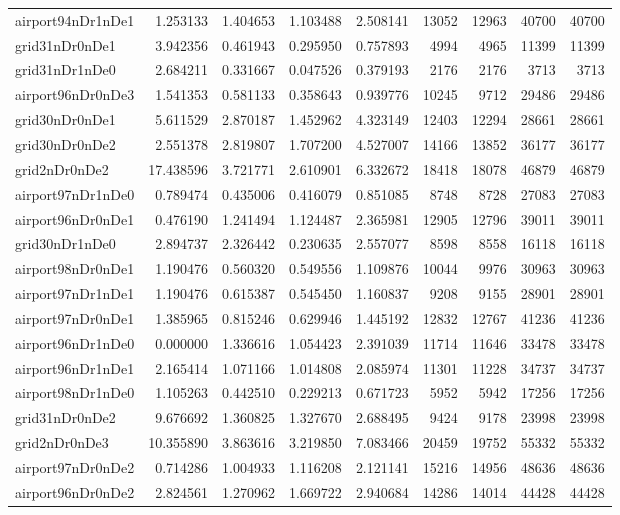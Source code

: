 \begin{longtable}{|l|r|r|r|r|r|r|r|r|}
airport94nDr1nDe1 & 1.253133 & 1.404653 & 1.103488 & 2.508141 & 13052 & 12963 & 40700 & 40700 \\
grid31nDr0nDe1 & 3.942356 & 0.461943 & 0.295950 & 0.757893 & 4994 & 4965 & 11399 & 11399 \\
grid31nDr1nDe0 & 2.684211 & 0.331667 & 0.047526 & 0.379193 & 2176 & 2176 & 3713 & 3713 \\
airport96nDr0nDe3 & 1.541353 & 0.581133 & 0.358643 & 0.939776 & 10245 & 9712 & 29486 & 29486 \\
grid30nDr0nDe1 & 5.611529 & 2.870187 & 1.452962 & 4.323149 & 12403 & 12294 & 28661 & 28661 \\
grid30nDr0nDe2 & 2.551378 & 2.819807 & 1.707200 & 4.527007 & 14166 & 13852 & 36177 & 36177 \\
grid2nDr0nDe2 & 17.438596 & 3.721771 & 2.610901 & 6.332672 & 18418 & 18078 & 46879 & 46879 \\
airport97nDr1nDe0 & 0.789474 & 0.435006 & 0.416079 & 0.851085 & 8748 & 8728 & 27083 & 27083 \\
airport96nDr0nDe1 & 0.476190 & 1.241494 & 1.124487 & 2.365981 & 12905 & 12796 & 39011 & 39011 \\
grid30nDr1nDe0 & 2.894737 & 2.326442 & 0.230635 & 2.557077 & 8598 & 8558 & 16118 & 16118 \\
airport98nDr0nDe1 & 1.190476 & 0.560320 & 0.549556 & 1.109876 & 10044 & 9976 & 30963 & 30963 \\
airport97nDr1nDe1 & 1.190476 & 0.615387 & 0.545450 & 1.160837 & 9208 & 9155 & 28901 & 28901 \\
airport97nDr0nDe1 & 1.385965 & 0.815246 & 0.629946 & 1.445192 & 12832 & 12767 & 41236 & 41236 \\
airport96nDr1nDe0 & 0.000000 & 1.336616 & 1.054423 & 2.391039 & 11714 & 11646 & 33478 & 33478 \\
airport96nDr1nDe1 & 2.165414 & 1.071166 & 1.014808 & 2.085974 & 11301 & 11228 & 34737 & 34737 \\
airport98nDr1nDe0 & 1.105263 & 0.442510 & 0.229213 & 0.671723 & 5952 & 5942 & 17256 & 17256 \\
grid31nDr0nDe2 & 9.676692 & 1.360825 & 1.327670 & 2.688495 & 9424 & 9178 & 23998 & 23998 \\
grid2nDr0nDe3 & 10.355890 & 3.863616 & 3.219850 & 7.083466 & 20459 & 19752 & 55332 & 55332 \\
airport97nDr0nDe2 & 0.714286 & 1.004933 & 1.116208 & 2.121141 & 15216 & 14956 & 48636 & 48636 \\
airport96nDr0nDe2 & 2.824561 & 1.270962 & 1.669722 & 2.940684 & 14286 & 14014 & 44428 & 44428 \\

\end{longtable}
